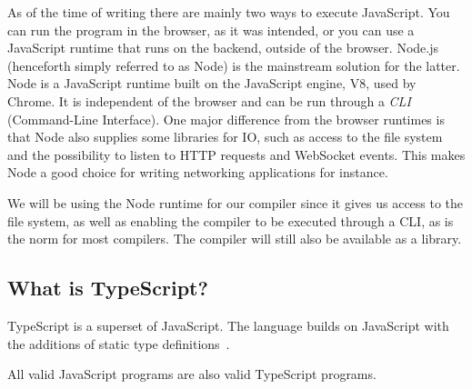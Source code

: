 As of the time of writing there are mainly two ways to execute JavaScript.
You can run the program in the browser, as it was intended, or you can use a JavaScript runtime that runs on the backend, outside of the browser.
Node.js (henceforth simply referred to as Node) is the mainstream solution for the latter.
Node is a JavaScript runtime built on the JavaScript engine, V8, used by Chrome.
It is independent of the browser and can be run through a \textit{CLI} (Command-Line Interface).
One major difference from the browser runtimes is that Node also supplies some libraries for IO, such as access to the file system and the possibility to listen to HTTP requests and WebSocket events.
This makes Node a good choice for writing networking applications for instance.

We will be using the Node runtime for our compiler since it gives us access to the file system, as well as enabling the compiler to be executed through a CLI, as is the norm for most compilers.
The compiler will still also be available as a library.

\subsection{What is TypeScript?}\label{subsec:what-is-typescript}

TypeScript is a superset of JavaScript.
The language builds on JavaScript with the additions of static type definitions~\cite{tswebsite}.

All valid JavaScript programs are also valid TypeScript programs.
